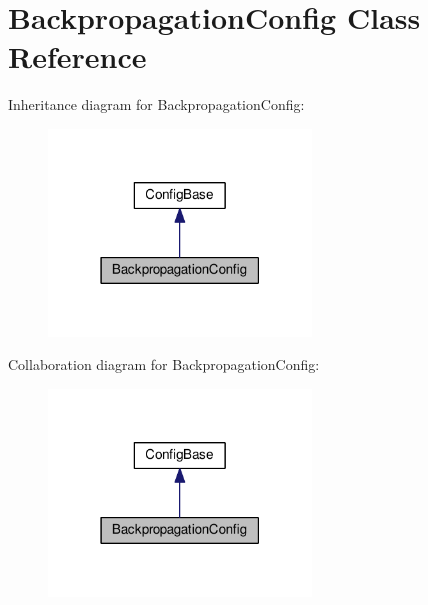 \hypertarget{class_backpropagation_config}{}\section{Backpropagation\+Config Class Reference}
\label{class_backpropagation_config}


Inheritance diagram for Backpropagation\+Config\+:\nopagebreak
\begin{figure}[H]
\begin{center}
\leavevmode
\includegraphics[width=198pt]{class_backpropagation_config__inherit__graph}
\end{center}
\end{figure}


Collaboration diagram for Backpropagation\+Config\+:\nopagebreak
\begin{figure}[H]
\begin{center}
\leavevmode
\includegraphics[width=198pt]{class_backpropagation_config__coll__graph}
\end{center}
\end{figure}
